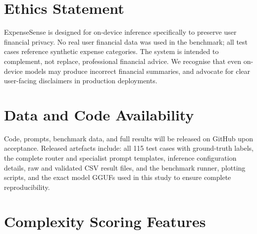 \documentclass[11pt,twocolumn]{article}
\begin{document}
\section*{Ethics Statement}

ExpenseSense is designed for on-device inference specifically to
preserve user financial privacy.
No real user financial data was used in the benchmark; all test cases
reference synthetic expense categories.
The system is intended to complement, not replace, professional
financial advice.
We recognise that even on-device models may produce incorrect
financial summaries, and advocate for clear user-facing disclaimers in
production deployments.

\section*{Data and Code Availability}

Code, prompts, benchmark data, and full results will be released on
GitHub upon acceptance.
Released artefacts include: all 115 test cases with ground-truth
labels, the complete router and specialist prompt templates, inference
configuration details, raw and validated CSV result files, and the
benchmark runner, plotting scripts, and the exact model GGUFs used in
this study to ensure complete reproducibility.



\appendix\onecolumn

\section{Complexity Scoring Features}
\label{sec:complexity_appendix}
\end{document}
